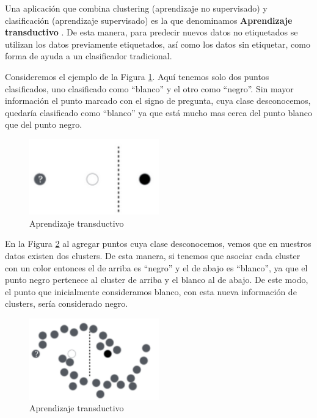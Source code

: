 \documentclass[12pt,a4paper]{article}
\begin{document}
\begin{sloppypar}
Una aplicación que combina clustering (aprendizaje no supervisado) y clasificación (aprendizaje supervisado) es la que denominamos \textbf{Aprendizaje transductivo}\cite{aprendiz_transd}\cite{apunte_uba} . De esta manera, para predecir nuevos datos no etiquetados se utilizan los datos previamente etiquetados, así como los datos sin etiquetar, como forma de ayuda a un clasificador tradicional.

Consideremos el ejemplo de la Figura \ref{fig:Transductivo_1}. Aquí tenemos solo dos puntos clasificados, uno clasificado como ``blanco'' y el otro como ``negro''. Sin mayor información el punto marcado con el signo de pregunta, cuya clase desconocemos, quedaría clasificado como ``blanco'' ya que está mucho mas cerca del punto blanco que del punto negro.

\begin{figure}[H]    %
  \centering
  \includegraphics[width=0.5\textwidth]{images/Transductivo_1.png}
  \caption{Aprendizaje transductivo}  
  \label{fig:Transductivo_1}
\end{figure}

En la Figura \ref{fig:Transductivo_2} al agregar puntos cuya clase desconocemos, vemos que en nuestros datos existen dos clusters. De esta manera, si tenemos que asociar cada cluster con un color entonces el de arriba es ``negro'' y el de abajo es ``blanco'', ya que el punto negro pertenece al cluster de arriba y el blanco al de abajo. De este modo, el punto que inicialmente consideramos blanco, con esta nueva información de clusters, sería considerado negro.

\begin{figure}[H]    %
  \centering
  \includegraphics[width=0.5\textwidth]{images/Transductivo_2.png}
  \caption{Aprendizaje transductivo}  
  \label{fig:Transductivo_2}
\end{figure}


\end{sloppypar}
\end{document}
